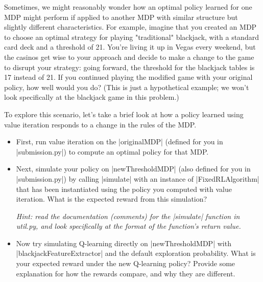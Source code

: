 \item {}
Sometimes, we might reasonably wonder how an optimal policy learned for one MDP
might perform if applied to another MDP with similar structure but slightly
different characteristics.  For example, imagine that you created an MDP to
choose an optimal strategy for playing "traditional" blackjack, with a standard
card deck and a threshold of 21.  You're living it up in Vegas every weekend,
but the casinos get wise to your approach and decide to make a change to the
game to disrupt your strategy: going forward, the threshold for the blackjack
tables is 17 instead of 21.  If you continued playing the modified game with
your original policy, how well would you do?  (This is just a hypothetical
example; we won't look specifically at the blackjack game in this problem.)

To explore this scenario, let's take a brief look at how a policy learned using
value iteration responds to a change in the rules of the MDP.

\begin{itemize}
  \item First, run value iteration on the |originalMDP| (defined for you in
  |submission.py|) to compute an optimal policy for that MDP.

  \item Next, simulate your policy on |newThresholdMDP| (also defined for you in
  |submission.py|) by calling |simulate| with an instance of |FixedRLAlgorithm|
  that has been instantiated using the policy you computed with value iteration.
  What is the expected reward from this simulation?

  {\em Hint: read the
  documentation (comments) for the |simulate| function in util.py, and look
  specifically at the format of the function's return value.}

  \item Now try simulating Q-learning directly on |newThresholdMDP| with
  |blackjackFeatureExtractor| and the default exploration probability. What is
  your expected reward under the new Q-learning policy?  Provide some
  explanation for how the rewards compare, and why they are different.
\end{itemize}
